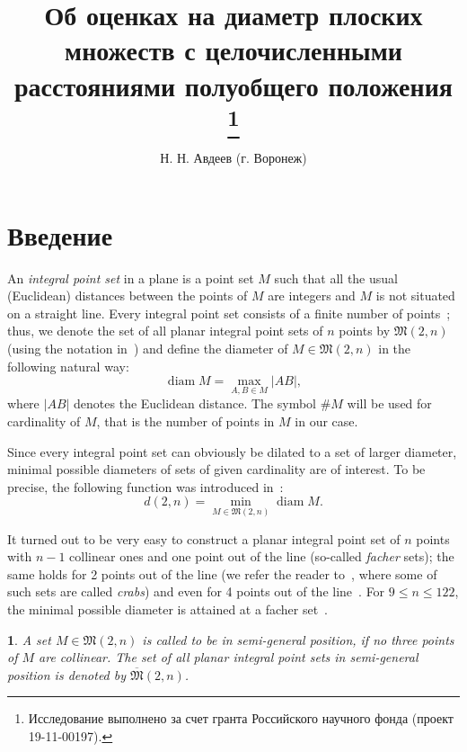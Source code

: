 \documentclass[11pt,twoside,draft
]{article}
\title
{%
Об оценках на диаметр плоских множеств с целочисленными расстояниями полуобщего положения%
\footnote{Исследование выполнено за счет гранта Российского научного фонда (проект 19-11-00197).}}
{%
On diameter bounds for planar integral point sets in semi-general position}
\author
{%
Н. Н. Авдеев (г. Воронеж)}
{%
N. N. Avdeev (Voronezh)}
\newtheorem{Definition}{\indent {\sc Definition}}
\begin{document}
\maketitle

\enmaketitle



\section{Введение}



An \textit{integral point set} in a plane is a point set $M$ such that all the usual (Euclidean) distances between the
points of $M$ are integers and $M$ is not situated on a straight line.
Every integral point set consists of a finite number of points~\cite{anning1945integral,erdos1945integral};
thus, we denote the set of all planar integral point sets of $n$ points by
$\mathfrak{M}(2,n)$ (using the notation in~\cite{our-vmmsh-2018})
and define the diameter of $M\in\mathfrak{M}(2,n)$ in the following natural way:
\begin{equation}
	\operatorname{diam} M = \max_{A,B\in M} |AB|
	,
\end{equation}
where $|AB|$ denotes the Euclidean distance.
The symbol $\# M$ will be used for cardinality of $M$, that is the number of points in $M$ in our case.

Since every integral point set can obviously be dilated to a set of larger diameter,
minimal possible diameters of sets of given cardinality are of interest.
To be precise,
the following function was introduced in~\cite{kurz2008bounds,kurz2008minimum}:
\begin{equation}
	d(2,n) = \min_{M\in\mathfrak{M}(2,n)} \operatorname{diam} M
	.
\end{equation}

It turned out to be very easy to construct a planar integral point set of $n$ points with $n-1$ collinear ones and one point out of the line
(so-called \textit{facher} sets);
the same holds for 2 points out of the line (we refer the reader to~\cite{antonov2008maximal}, where some of such sets are called \textit{crabs})
and even for 4 points out of the line~\cite{huff1948diophantine}.
For $9\leq n\leq 122$, the minimal possible diameter is attained at a facher set~\cite{kurz2008bounds}.


\begin{Definition}
	A set $M\in\mathfrak{M}(2,n)$ is called to be in \textit{semi-general position},
	if no three points of $M$ are collinear.
	The set of all planar integral point sets in semi-general position
	is denoted by $\overline{\mathfrak{M}}(2,n)$.
\end{Definition}
\end{document}
